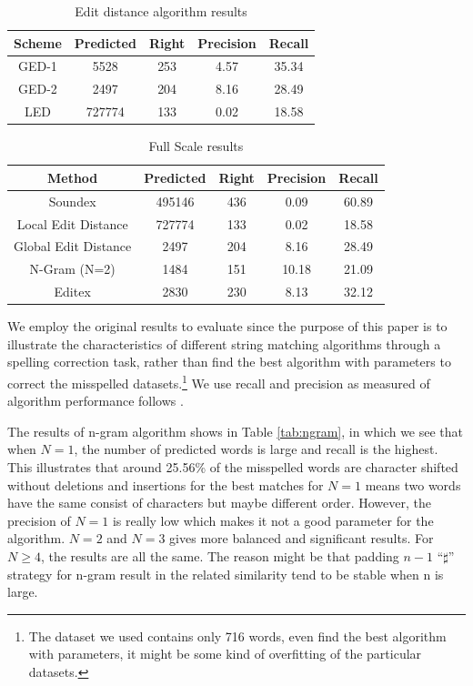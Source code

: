 \documentclass[11pt]{article}
\begin{document}
\begin{table}
	\small
	\centering
	\begin{tabular}{c|c|c|c|c}
		\hline
		Scheme &Predicted & Right & Precision & Recall \\
		\hline
		GED-1 & 5528 & 253 & 4.57 & 35.34 \\
		\hline
		GED-2 & 2497 & 204 & 8.16 & 28.49 \\
		\hline
		LED & 727774 & 133 & 0.02 & 18.58 \\
		\hline
	\end{tabular}
	\caption{Edit distance algorithm results}
	\label{tab:editdis}
\end{table}

\begin{table}
	\centering
	\small
	\begin{tabular}{c|c|c|c|c}
		\hline
		Method &Predicted & Right & Precision & Recall \\
		\hline
		Soundex & 495146 & 436 & 0.09 & 60.89 \\
		\hline
		Local Edit Distance  & 727774 & 133 & 0.02 & 18.58 \\
		\hline
		Global Edit Distance  & 2497 & 204 & 8.16 & 28.49 \\
		\hline
		N-Gram (N=2) & 1484 & 151 & 10.18 & 21.09 \\
		\hline
		Editex & 2830 & 230 & 8.13 & 32.12 \\
		\hline
	\end{tabular}
	\caption{Full Scale results}
	\label{tab:result}
\end{table}

We employ the original results to evaluate since the purpose of this paper is to illustrate the characteristics of different string matching algorithms through a spelling correction task, rather than find the best algorithm with parameters to correct the misspelled datasets.\footnote{The dataset we used contains only 716 words, even find the best algorithm with parameters, it might be some kind of overfitting of the particular datasets.} We use recall and precision as measured of algorithm performance follows \cite{Raghavan1989}.

The results of n-gram algorithm shows in Table \ref{tab:ngram}, in which we see that when $N=1$, the number of predicted words is large and recall is the highest. This illustrates that around 25.56\% of the misspelled words are character shifted without deletions and insertions for the best matches for $N=1$ means two words have the same consist of characters but maybe different order. However, the precision of $N=1$ is really low which makes it not a good parameter for the algorithm. $N=2$ and $N=3$ gives more balanced and significant results. For $N\geq 4$, the results are all the same. The reason might be that padding $n-1$ ``$\sharp$'' strategy for n-gram result in the related similarity tend to be stable when n is large. 
\end{document}
